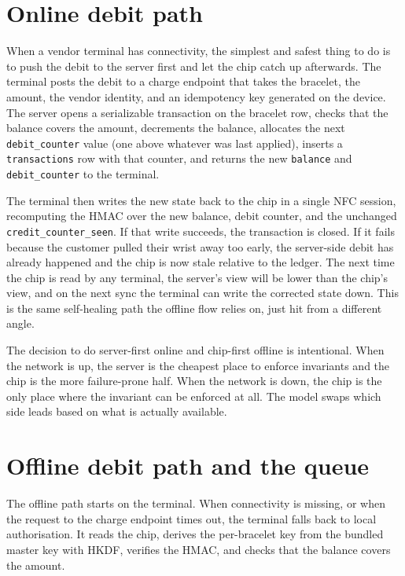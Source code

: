 \section{Online debit path}
\label{sec:impl-online-debit}

When a vendor terminal has connectivity, the simplest and safest thing to do is to push the debit to the server first and let the chip catch up afterwards. The terminal posts the debit to a charge endpoint that takes the bracelet, the amount, the vendor identity, and an idempotency key generated on the device. The server opens a serializable transaction on the bracelet row, checks that the balance covers the amount, decrements the balance, allocates the next \texttt{debit\_counter} value (one above whatever was last applied), inserts a \texttt{transactions} row with that counter, and returns the new \texttt{balance} and \texttt{debit\_counter} to the terminal.

The terminal then writes the new state back to the chip in a single NFC session, recomputing the HMAC over the new balance, debit counter, and the unchanged \texttt{credit\_counter\_seen}. If that write succeeds, the transaction is closed. If it fails because the customer pulled their wrist away too early, the server-side debit has already happened and the chip is now stale relative to the ledger. The next time the chip is read by any terminal, the server's view will be lower than the chip's view, and on the next sync the terminal can write the corrected state down. This is the same self-healing path the offline flow relies on, just hit from a different angle.

The decision to do server-first online and chip-first offline is intentional. When the network is up, the server is the cheapest place to enforce invariants and the chip is the more failure-prone half. When the network is down, the chip is the only place where the invariant can be enforced at all. The model swaps which side leads based on what is actually available.

\section{Offline debit path and the queue}
\label{sec:impl-offline-debit}

The offline path starts on the terminal. When connectivity is missing, or when the request to the charge endpoint times out, the terminal falls back to local authorisation. It reads the chip, derives the per-bracelet key from the bundled master key with HKDF, verifies the HMAC, and checks that the balance covers the amount.

